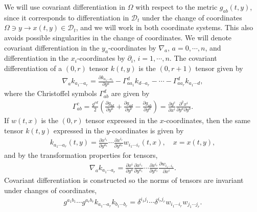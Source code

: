 \documentclass[12pt,reqno]{amsart}
\numberwithin{equation}{section}
\theoremstyle{definition}
\theoremstyle{remark}
\begin{document}
We will use covariant differentiation in $\Omega$ with respect to the metric $g_{ab}(t,y)$, since it corresponds to differentiation in ${{\mathscr{D}_t}}$ under the change of coordinates $\Omega \ni y\to x(t,y)\in{{\mathscr{D}_t}}$, and we will work in both coordinate systems. This also avoids possible singularities in the change of coordinates. We will denote covariant differentiation in the $y_a$-coordinates by ${\nabla}_a$, $a=0, \cdots, n$, and differentiation in the $x_i$-coordinates by ${\partial}_i$, $i=1,\cdots,n$. The covariant differentiation of a $(0,r)$ tensor $k(t,y)$ is the $(0,r+1)$ tensor given by
\begin{align}
  {\nabla}_a k_{a_1\cdots a_r}=\frac{{\partial} k_{a_1\cdots a_r}}{{\partial} y^a}-\Gamma_{aa_1}^d k_{d\cdots a_r}-\cdots-\Gamma_{aa_r}^dk_{a_1\cdots d},
\end{align}
where the Christoffel symbols $\Gamma_{ab}^d$ are given by
\begin{align}
  \Gamma_{ab}^c=\frac{g^{cd}}{2}\left(\frac{{\partial} g_{bd}}{{\partial} y^a}+\frac{{\partial} g_{ad}}{{\partial} y^b}-\frac{{\partial} g_{ab}}{{\partial} y^d}\right)=\frac{{\partial} y^c}{{\partial} x^i}\frac{{\partial}^2 x^i}{{\partial} y^a {\partial} y^b}.
\end{align}
If $w(t,x)$ is the $(0,r)$ tensor expressed in the $x$-coordinates, then the same tensor $k(t,y)$ expressed in the $y$-coordinates is given by
\begin{align}
  k_{a_1\cdots a_r}(t,y)=\frac{{\partial} x^{i_1}}{{\partial} y^{a_1}}\cdots \frac{{\partial} x^{i_r}}{{\partial} y^{a_r}}w_{i_1\cdots i_r}(t,x), \quad x=x(t,y),
\end{align}
and by the transformation properties for tensors,
\begin{align}\label{eq.covtensor}
  {\nabla}_a k_{a_1\cdots a_r}=\frac{{\partial} x^i}{{\partial} y^a}\frac{{\partial} x^{i_1}}{{\partial} y^{a_1}}\cdots \frac{{\partial} x^{i_r}}{{\partial} y^{a_r}}\frac{{\partial} w_{i_1\cdots i_r}}{{\partial} x^i}.
\end{align}
Covariant differentiation is constructed so the norms of tensors are invariant under changes of coordinates,
\begin{align}\label{eq.norminv}
  g^{a_1b_1}\cdots g^{a_rb_r} k_{a_1\cdots a_r}k_{b_1\cdots b_r}=\delta^{i_1j_1}\cdots \delta^{i_rj_r}w_{i_1\cdots i_r}w_{j_1\cdots j_r}.
\end{align}
\end{document}
